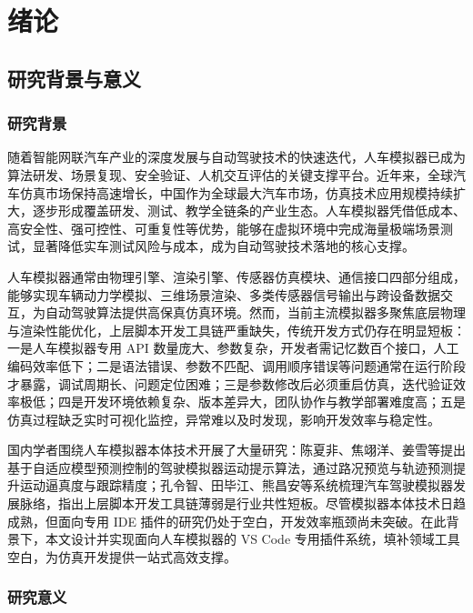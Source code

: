
\chapter{绪论}

\section{研究背景与意义}

\subsection{研究背景}

随着智能网联汽车产业的深度发展与自动驾驶技术的快速迭代，人车模拟器已成为算法研发、场景复现、安全验证、人机交互评估的关键支撑平台。近年来，全球汽车仿真市场保持高速增长，中国作为全球最大汽车市场，仿真技术应用规模持续扩大，逐步形成覆盖研发、测试、教学全链条的产业生态。人车模拟器凭借低成本、高安全性、强可控性、可重复性等优势，能够在虚拟环境中完成海量极端场景测试，显著降低实车测试风险与成本，成为自动驾驶技术落地的核心支撑。

人车模拟器通常由物理引擎、渲染引擎、传感器仿真模块、通信接口四部分组成，能够实现车辆动力学模拟、三维场景渲染、多类传感器信号输出与跨设备数据交互，为自动驾驶算法提供高保真仿真环境。然而，当前主流模拟器多聚焦底层物理与渲染性能优化，上层脚本开发工具链严重缺失，传统开发方式仍存在明显短板：一是人车模拟器专用
API
数量庞大、参数复杂，开发者需记忆数百个接口，人工编码效率低下；二是语法错误、参数不匹配、调用顺序错误等问题通常在运行阶段才暴露，调试周期长、问题定位困难；三是参数修改后必须重启仿真，迭代验证效率极低；四是开发环境依赖复杂、版本差异大，团队协作与教学部署难度高；五是仿真过程缺乏实时可视化监控，异常难以及时发现，影响开发效率与稳定性。

国内学者围绕人车模拟器本体技术开展了大量研究：陈夏非、焦翊洋、姜雪等提出基于自适应模型预测控制的驾驶模拟器运动提示算法，通过路况预览与轨迹预测提升运动逼真度与跟踪精度\cite{ref1}；孔令智、田毕江、熊昌安等系统梳理汽车驾驶模拟器发展脉络，指出上层脚本开发工具链薄弱是行业共性短板\cite{ref2}。尽管模拟器本体技术日趋成熟，但面向专用
IDE
插件的研究仍处于空白，开发效率瓶颈尚未突破。在此背景下，本文设计并实现面向人车模拟器的
VS Code 专用插件系统，填补领域工具空白，为仿真开发提供一站式高效支撑。

\subsection{研究意义}


